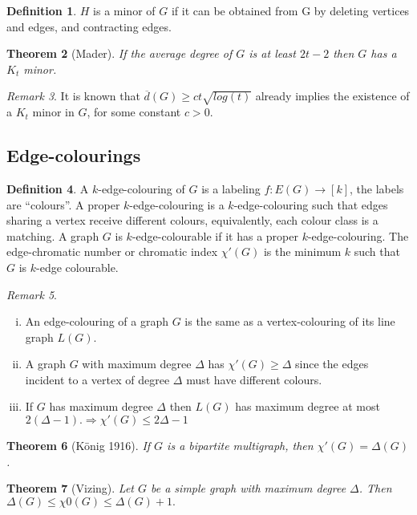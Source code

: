 \documentclass[10pt, fleqn, a4paper, landscape]{article}
\theoremstyle{plain} %
\newtheorem{thm}{Theorem}
\theoremstyle{remark} %
\newtheorem{rem}[thm]{Remark}
\theoremstyle{definition} %
\newtheorem{defi}[thm]{Definition}
\begin{document}
\begin{multicols}{3}
\begin{tiny}
\begin{defi}
$H$ is a minor of $G$ if it can be obtained from G by deleting vertices and edges, and contracting edges.
\end{defi}
\addtocounter{thm}{2}
\begin{thm}[Mader]
If the average degree of $G$ is at least $2t-2$ then $G$ has a $K_t$ minor.
\end{thm}

\begin{rem}
It is known that $\overline{d}(G) \ge ct\sqrt{log(t)}$ already implies the existence of a $K_t$ minor in $G$, for some constant $c > 0$.
\end{rem}
\subsection{Edge-colourings}
\begin{defi}
A $k$-edge-colouring of $G$ is a labeling $f : E(G) \to [k]$, the labels are “colours”. A proper $k$-edge-colouring is a $k$-edge-colouring such that edges sharing a vertex receive different colours, equivalently, each colour class is a matching. A graph $G$ is $k$-edge-colourable if it has a
proper $k$-edge-colouring. The edge-chromatic number or chromatic index $\chi'(G)$ is the minimum $k$ such that $G$ is $k$-edge colourable.
\end{defi}

\begin{rem}
\begin{enumerate}[(i)]
\item An edge-colouring of a graph $G$ is the same as a vertex-colouring of its line graph $L(G)$.
\item A graph $G$ with maximum degree $\Delta$ has $\chi'(G) \ge \Delta$ since the edges incident to a vertex of degree $\Delta$ must have different colours.
\item If $G$ has maximum degree $\Delta$ then $L(G)$ has maximum degree at most $2(\Delta-1).\Rightarrow \chi'(G) \le 2\Delta - 1$ 
\end{enumerate}
\end{rem}

\begin{thm}[König 1916]
If $G$ is a bipartite multigraph, then $\chi'(G) = \Delta(G)$.
\end{thm}

\begin{thm}[Vizing]
Let $G$ be a simple graph with maximum degree $\Delta$. Then $\Delta(G)\le \chi0(G) \le \Delta(G) + 1.$
\end{thm}
\addtocounter{thm}{1}


\end{tiny}
\end{multicols}
\end{document}
